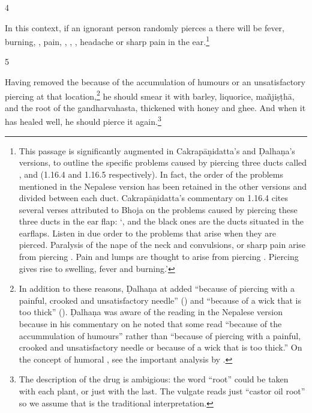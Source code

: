 \begin{translation}
\item [4] 
 
In this context, if an ignorant person randomly pierces a 
there will be fever, burning, , pain, 
,
, 
,
headache or sharp pain in the ear.\footnote{This passage is significantly
    augmented in Cakrapāṇidatta's and Ḍalhaṇa's versions, to outline the specific
    problems caused by piercing three ducts called ,  and
     (1.16.4 \citep[126]{acar-1939} and 1.16.5 \citep[77]{vulgate}
    respectively). In fact, the order of the problems mentioned in the Nepalese
    version has been retained in the other versions and divided between each duct.
    Cakrapāṇidatta's commentary on 1.16.4 \citep[126]{acar-1939} cites several verses
    attributed to Bhoja on the problems caused by piercing these three ducts in the
    ear flap: `,  and the black ones are the ducts
    situated in the earflaps.  Listen in due order to the problems that arise when
    they are pierced. Paralysis of the nape of the neck and convulsions, or sharp pain
    arise from piercing . Pain and lumps are thought to arise from
    piercing . Piercing  gives rise to swelling, fever and
    burning.'}
    
\item[5]     
    
Having removed the  because of the accumulation of humours or
an unsatisfactory piercing at that location,\footnote{In addition to these
    reasons, Ḍalhaṇa at  added “because of piercing with
    a painful, crooked and unsatisfactory needle”
    () and “because of a wick that is too
    thick” (). Ḍalhaṇa was aware of the reading in the
    Nepalese version because in his commentary on  he noted that
    some read “because of the accummulation of humours” rather than “because of
    piercing with a painful, crooked and unsatisfactory needle or because of a
    wick that is too thick.” On the concept of humoral
    , see the important analysis by \citet{meul-1992}.}
    he should smear it with barley, liquorice, 
    \gls{mañjiṣṭhā},
    and the root of the 
    \gls{gandharvahasta},
    thickened with honey and ghee. And when it has healed well, he should pierce
    it again.\footnote{The description of the drug is ambigious: the word “root”
        could be taken with each plant, or just with the last.  The vulgate reads just
        “castor oil root” so we assume that is the traditional interpretation.}
    

\end{translation}
